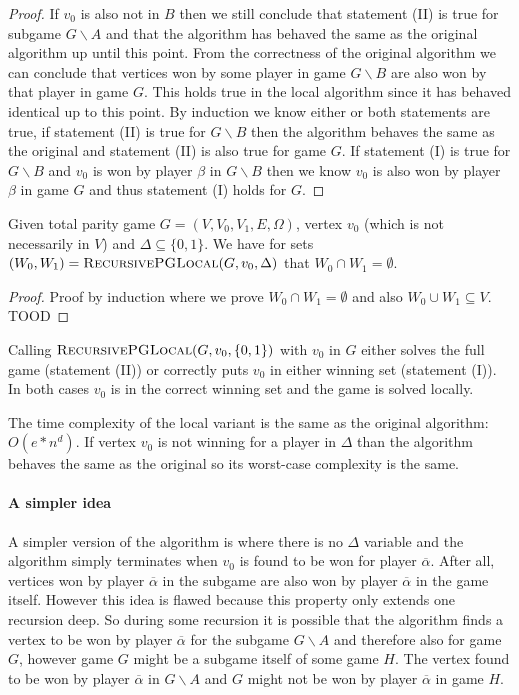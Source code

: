 \begin{theorem}
\begin{proof}
	If $v_0$ is also not in $B$ then we still conclude that statement (II) is true for subgame $G\backslash A$ and that the algorithm has behaved the same as the original algorithm up until this point. From the correctness of the original algorithm we can conclude that vertices won by some player in game $G\backslash B$ are also won by that player in game $G$. This holds true in the local algorithm since it has behaved identical up to this point. By induction we know either or both statements are true, if statement (II) is true for $G\backslash B$ then the algorithm behaves the same as the original and statement (II) is also true for game $G$. If statement (I) is true for $G \backslash B$ and $v_0$ is won by player $\beta$ in $G\backslash B$ then we know $v_0$ is also won by player $\beta$ in game $G$ and thus statement (I) holds for $G$.
\end{proof}
\end{theorem}

\begin{theorem}
	Given total parity game $G = (V,V_0,V_1,E,\Omega)$, vertex $v_0$ (which is not necessarily in $V$) and $\Delta \subseteq \{0,1\}$. We have for sets $(W_0,W_1) = \textsc{RecursivePGLocal}(G,v_0,\Delta)$ that 
	$W_0 \cap W_1 = \emptyset$.
	\begin{proof}
		Proof by induction where we prove $W_0 \cap W_1 = \emptyset$ and also $W_0 \cup W_1 \subseteq V$.
		TOOD
	\end{proof}
\end{theorem}
Calling $\textsc{RecursivePGLocal}(G, v_0, \{0,1\})$ with $v_0$ in $G$ either solves the full game (statement (II)) or correctly puts $v_0$ in either winning set (statement (I)). In both cases $v_0$ is in the correct winning set and the game is solved locally.

The time complexity of the local variant is the same as the original algorithm: $O(e*n^d)$. If vertex $v_0$ is not winning for a player in $\Delta$ than the algorithm behaves the same as the original so its worst-case complexity is the same.

\paragraph{A simpler idea} A simpler version of the algorithm is where there is no $\Delta$ variable and the algorithm simply terminates when $v_0$ is found to be won for player $\overline{\alpha}$. After all, vertices won by player $\overline{\alpha}$ in the subgame are also won by player $\overline{\alpha}$ in the game itself. However this idea is flawed because this property only extends one recursion deep. So during some recursion it is possible that the algorithm finds a vertex to be won by player $\overline{\alpha}$ for the subgame $G\backslash A$ and therefore also for game $G$, however game $G$ might be a subgame itself of some game $H$. The vertex found to be won by player $\overline{\alpha}$ in $G\backslash A$ and $G$ might not be won by player $\overline{\alpha}$ in game $H$.

